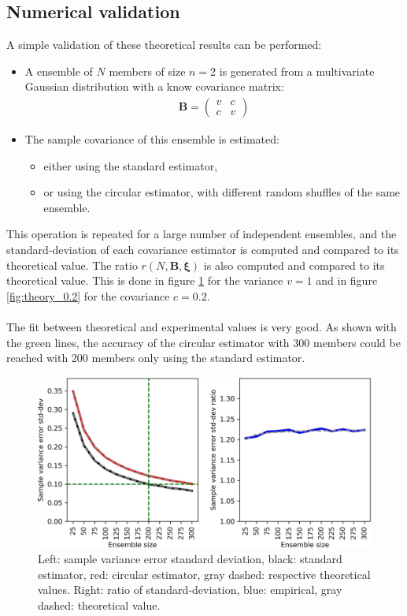 \documentclass[12pt]{scrartcl}
\begin{document}
\subsection{Numerical validation}
A simple validation of these theoretical results can be performed:
\begin{itemize}
\item A ensemble of $N$ members of size $n=2$ is generated from a multivariate Gaussian distribution with a know covariance matrix:
\begin{align}
\mathbf{B} = \left( \begin{array}{cc}
v & c \\
c & v
\end{array} \right)
\end{align}
\item The sample covariance of this ensemble is estimated:
\begin{itemize}
\item either using the standard estimator,
\item or using the circular estimator, with different random shuffles of the same ensemble.
\end{itemize}
\end{itemize}
This operation is repeated for a large number of independent ensembles, and the standard-deviation of each covariance estimator is computed and compared to its theoretical value. The ratio $r\left(N, \mathbf{B}, \boldsymbol{\xi}\right)$ is also computed and compared to its theoretical value. This is done in figure \ref{fig:theory_1.0} for the variance $v = 1$ and in figure \ref{fig:theory_0.2} for the covariance $c = 0.2$.\\
$  $\\
The fit between theoretical and experimental values is very good. As shown with the green lines, the accuracy of the circular estimator with 300 members could be reached with 200 members only using the standard estimator.

\begin{figure}[h!]
  \noindent\includegraphics[width=\textwidth]{theory_1.0.jpg}
  \caption{Left: sample variance error standard deviation, black: standard estimator, red: circular estimator, gray dashed: respective theoretical values. Right: ratio of standard-deviation, blue: empirical, gray dashed: theoretical value.} \label{fig:theory_1.0}
\end{figure}
\end{document}
